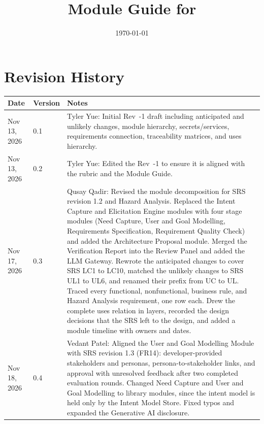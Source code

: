 \documentclass[12pt, titlepage]{article}
\begin{document}
\title{Module Guide for \progname{}}
\author{\authname}
\date{\today}

\maketitle


\section{Revision History}

\begin{longtable}{p{2.6cm}p{1.7cm}p{\dimexpr\textwidth-4.3cm-6\tabcolsep\relax}}
\toprule {\bf Date} & {\bf Version} & {\bf Notes}\\
\midrule
\endhead
Nov 13, 2026 & 0.1 & Tyler Yue: Initial Rev~-1 draft including anticipated and
unlikely changes, module hierarchy, secrets/services, requirements connection,
traceability matrices, and uses hierarchy.\\
Nov 13, 2026 & 0.2 & Tyler Yue: Edited the Rev~-1 to ensure it is aligned with the rubric and the Module Guide.\\
Nov 17, 2026 & 0.3 & Qusay Qadir: Revised the module decomposition for SRS
revision 1.2 and Hazard Analysis. Replaced the Intent Capture and Elicitation Engine
modules with four stage modules (Need Capture, User and Goal Modelling,
Requirements Specification, Requirement Quality Check) and added the
Architecture Proposal module. Merged the Verification Report
into the Review Panel and added the LLM Gateway. 
Rewrote the anticipated changes to cover SRS LC1 to LC10, matched the
unlikely changes to SRS UL1 to UL6, and renamed their prefix from UC to UL. 
Traced every functional, nonfunctional, business rule, and Hazard Analysis requirement,
one row each.
Drew the complete uses relation in layers, recorded the design decisions that
the SRS left to the design, and added a module timeline with owners and
dates.\\
Nov 18, 2026 & 0.4 & Vedant Patel: Aligned the User and Goal Modelling
Module with SRS revision 1.3 (FR14): developer-provided stakeholders and
personas, persona-to-stakeholder links, and approval with unresolved feedback
after two completed evaluation rounds. Changed Need Capture and User and Goal
Modelling to library modules, since the intent model is held only by the
Intent Model Store. Fixed typos and expanded the Generative AI disclosure.\\
\bottomrule
\end{longtable}
\end{document}
